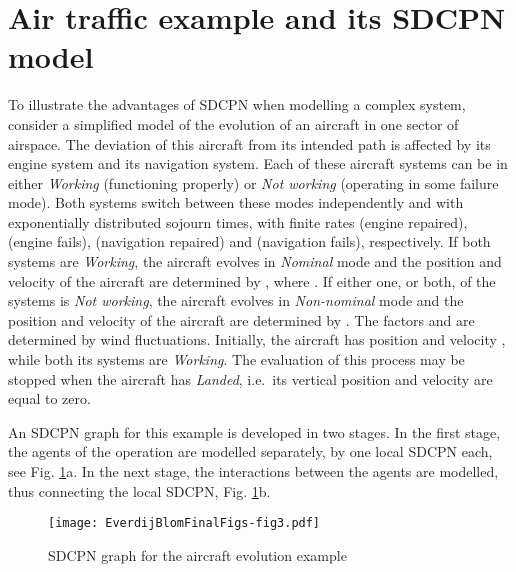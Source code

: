\documentclass[copyright,creativecommons]{eptcs}
\begin{document}
\section{Air traffic example and its SDCPN model}\label{sec:airtrafficSDCPN}
To illustrate the advantages of SDCPN when modelling a complex
system, consider a simplified model of the evolution of an
aircraft in one sector of airspace. The deviation of this aircraft
from its intended path is affected by its engine system and its
navigation system. Each of these aircraft systems can be in either
{\em Working} (functioning properly) or {\em Not working}
(operating in some failure mode). Both systems switch between
these modes independently and with exponentially distributed
sojourn times, with finite rates  (engine repaired),
 (engine fails),  (navigation repaired) and
 (navigation fails), respectively. If both systems are
{\em Working}, the aircraft evolves in {\em Nominal} mode and the
position  and velocity  of the aircraft are determined
by , where . If either one, or both, of the systems is {\em Not
working}, the aircraft evolves in {\em Non-nominal} mode and the
position and velocity of the aircraft are determined by . The factors  and  are determined by wind fluctuations.
Initially, the aircraft has position  and velocity ,
while both its systems are {\em Working}. The evaluation of this
process may be stopped when the aircraft has {\em Landed}, i.e.\
its vertical position and velocity are equal to zero.

An SDCPN graph for this example is developed in two stages. In
the first stage, the agents of the operation are modelled separately,
by one local SDCPN each, see Fig. \ref{fig:LPN example integrated}a.
In the next stage, the interactions between
the agents are modelled, thus connecting the local SDCPN,
Fig. \ref{fig:LPN example integrated}b.

\begin{figure}[h!bt]
\begin{center}
\texttt{[image: EverdijBlomFinalFigs-fig3.pdf]}
\end{center}
\caption{SDCPN graph for the aircraft evolution example}
\label{fig:LPN example integrated}
\end{figure}
\end{document}
